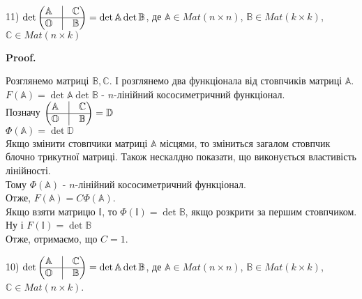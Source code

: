 \documentclass[a4paper, 10pt]{article}
\makeatletter
\theoremstyle{theoremdd}
\renewenvironment{proof}[1][Proof.\\]{\par
\pushQED{\hfill \qed}%
\normalfont \topsep6\p@\@plus6\p@\relax
\trivlist
\item\relax
{\bfseries
#1\@addpunct{.}}\hspace\labelsep\ignorespaces
}{%
\popQED\endtrivlist\@endpefalse
}
\makeatother
\begin{document}
11) $\det \begin{pmatrix}
 \mathbb{A} & \vline & \mathbb{C} \\
 \hline
 \mathbb{O} & \vline & \mathbb{B}
\end{pmatrix} = \det \mathbb{A} \det \mathbb{B}$, де $\mathbb{A} \in Mat(n \times n)$, $\mathbb{B} \in Mat(k \times k)$, $\mathbb{C} \in Mat(n \times k)$
\begin{proof}
Розглянемо матриці $\mathbb{B}, \mathbb{C}$. І розглянемо два функціонала від стовпчиків матриці $\mathbb{A}$.\\
$F(\mathbb{A}) = \det \mathbb{A} \det \mathbb{B}$ - $n$-лінійний кососиметричний функціонал.\\
Позначу $\begin{pmatrix}
 \mathbb{A} & \vline & \mathbb{C} \\
 \hline
 \mathbb{O} & \vline & \mathbb{B}
\end{pmatrix} = \mathbb{D}$\\
$\Phi(\mathbb{A}) = \det \mathbb{D}$\\
Якщо змінити стовпчики матриці $\mathbb{A}$ місцями, то зміниться загалом стовпчик блочно трикутної матриці. Також нескалдно показати, що виконується властивість лінійності.\\
Тому $\Phi(\mathbb{A})$ - $n$-лінійний кососиметричний функціонал.\\
Отже, $F(\mathbb{A}) = C\Phi(\mathbb{A})$.\\
Якщо взяти матрицю $\mathbb{I}$, то $\Phi(\mathbb{I}) = \det \mathbb{B}$, якщо розкрити за першим стовпчиком. Ну і $F(\mathbb{I}) = \det \mathbb{B}$\\
Отже, отримаємо, що $C = 1$.
\end{proof}
\fi

10) $\det \begin{pmatrix}
 \mathbb{A} & \vline & \mathbb{C} \\
 \hline
 \mathbb{O} & \vline & \mathbb{B}
\end{pmatrix} = \det \mathbb{A} \det \mathbb{B}$, де $\mathbb{A} \in Mat(n \times n)$, $\mathbb{B} \in Mat(k \times k)$, $\mathbb{C} \in Mat(n \times k)$.
\end{document}
